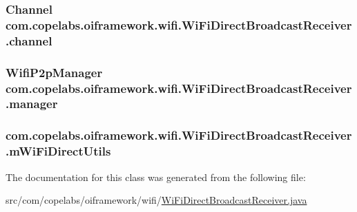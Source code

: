 \subsubsection[{channel}]{\setlength{\rightskip}{0pt plus 5cm}Channel com.\+copelabs.\+oiframework.\+wifi.\+Wi\+Fi\+Direct\+Broadcast\+Receiver.\+channel\hspace{0.3cm}{\ttfamily [private]}}\label{classcom_1_1copelabs_1_1oiframework_1_1wifi_1_1_wi_fi_direct_broadcast_receiver_a473acb917add689a28682aa22cee8237}
\hypertarget{classcom_1_1copelabs_1_1oiframework_1_1wifi_1_1_wi_fi_direct_broadcast_receiver_a2edba703acb8c53fdc2240bcc7e9335d}{}
\subsubsection[{manager}]{\setlength{\rightskip}{0pt plus 5cm}Wifi\+P2p\+Manager com.\+copelabs.\+oiframework.\+wifi.\+Wi\+Fi\+Direct\+Broadcast\+Receiver.\+manager\hspace{0.3cm}{\ttfamily [private]}}\label{classcom_1_1copelabs_1_1oiframework_1_1wifi_1_1_wi_fi_direct_broadcast_receiver_a2edba703acb8c53fdc2240bcc7e9335d}
\hypertarget{classcom_1_1copelabs_1_1oiframework_1_1wifi_1_1_wi_fi_direct_broadcast_receiver_a1a6dfa8aeb56af5456fc35250c9ddaee}{}
\subsubsection[{m\+Wi\+Fi\+Direct\+Utils}]{ com.\+copelabs.\+oiframework.\+wifi.\+Wi\+Fi\+Direct\+Broadcast\+Receiver.\+m\+Wi\+Fi\+Direct\+Utils\hspace{0.3cm}{\ttfamily [private]}}\label{classcom_1_1copelabs_1_1oiframework_1_1wifi_1_1_wi_fi_direct_broadcast_receiver_a1a6dfa8aeb56af5456fc35250c9ddaee}


The documentation for this class was generated from the following file\+:\begin{DoxyCompactItemize}
\item 
src/com/copelabs/oiframework/wifi/\hyperlink{_wi_fi_direct_broadcast_receiver_8java}{Wi\+Fi\+Direct\+Broadcast\+Receiver.\+java}\end{DoxyCompactItemize}
